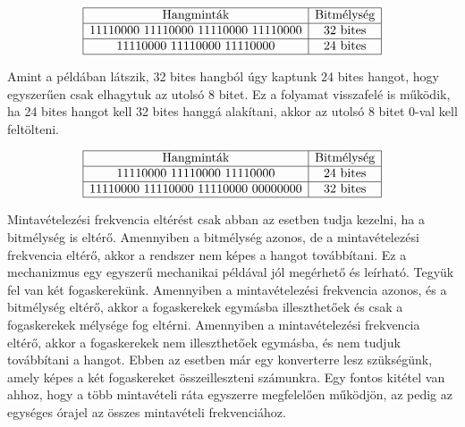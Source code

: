 \begin{align*}
	\begin{array}{|c|c|}
	\hline
	\text{Hangminták} & \text{Bitmélység} \\
	\hline
	\text{11110000 11110000 11110000 11110000} & \text{32 bites} \\
	\hline
	\text{11110000 11110000 11110000} & \text{24 bites} \\
	\hline
	\end{array}
\end{align*}
	
Amint a példában látszik, 32 bites hangból úgy kaptunk 24 bites hangot, 
hogy egyszerűen csak elhagytuk az utolsó 8 bitet. Ez a folyamat visszafelé is működik,
ha 24 bites hangot kell 32 bites hanggá alakítani, akkor az utolsó 8 bitet 0-val kell feltölteni.

\begin{align*}
	\begin{array}{|c|c|}
	\hline
	\text{Hangminták} & \text{Bitmélység} \\
	\hline
	\text{11110000 11110000 11110000} & \text{24 bites} \\
	\hline
	\text{11110000 11110000 11110000 00000000} & \text{32 bites} \\
	\hline
	\end{array}
\end{align*}

Mintavételezési frekvencia eltérést csak abban az esetben tudja kezelni, ha a
bitmélység is eltérő. Amennyiben a bitmélység azonos, de a mintavételezési
frekvencia eltérő, akkor a rendszer nem képes a hangot továbbítani.
Ez a mechanizmus egy egyszerű mechanikai példával jól megérhető és leírható.
Tegyük fel van két fogaskerekünk. Amennyiben a mintavételezési frekvencia azonos, és a 
bitmélység eltérő, akkor a fogaskerekek egymásba illeszthetőek és csak a fogaskerekek
mélysége fog eltérni. Amennyiben a mintavételezési frekvencia eltérő, akkor a fogaskerekek
nem illeszthetőek egymásba, és nem tudjuk továbbítani a hangot. Ebben az esetben már egy
konverterre lesz szükségünk, amely képes a két fogaskereket összeilleszteni számunkra.
Egy fontos kitétel van ahhoz, hogy a több mintavételi ráta egyszerre megfelelően működjön,
az pedig az egységes órajel az összes mintavételi frekvenciához.

